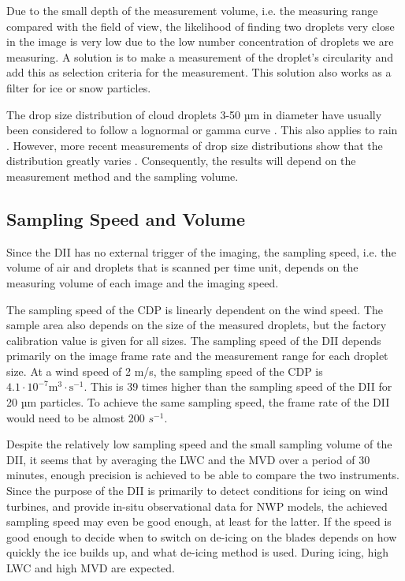 Due to the small depth of the measurement volume, i.e. the measuring range compared with the field of view, the likelihood of finding two droplets very close in the image is very low due to the low number concentration of droplets we are measuring. A solution is to make a measurement of the droplet’s circularity and add this as selection criteria for the measurement. This solution also works as a filter for ice or snow particles. 

The drop size distribution of cloud droplets 3-50 µm in diameter have usually been considered to follow a lognormal or gamma curve \cite{miles2000,lee2010,sein1998}. This also applies to rain \cite{ulb1983}. However, more recent measurements of drop size distributions show that the distribution greatly varies \cite{james2001,shaw2002,peters2005,cob2011}. Consequently, the results will depend on the measurement method and the sampling volume.

\subsection{Sampling Speed and Volume}

Since the DII has no external trigger of the imaging, the sampling speed, i.e. the volume of air and droplets that is scanned per time unit, depends on the measuring volume of each image and the imaging speed. 

The sampling speed of the CDP is linearly dependent on the wind speed. The sample area also depends on the size of the measured droplets, but the factory calibration value is given for all sizes. The sampling speed of the DII depends primarily on the image frame rate and the measurement range for each droplet size. At a wind speed of 2 m/s, the sampling speed of the CDP is $\mathrm{4.1 \cdot 10^{-7} m^{3} \cdot s^{-1}}$. This is 39 times higher than the sampling speed of the DII for 20 µm particles. To achieve the same sampling speed, the frame rate of the DII would need to be almost 200 $s^{-1}$. 

Despite the relatively low sampling speed and the small sampling volume of the DII, it seems that by averaging the LWC and the MVD over a period of 30 minutes, enough precision is achieved to be able to compare the two instruments. Since the purpose of the DII is primarily to detect conditions for icing on wind turbines, and provide in-situ observational data for NWP models, the achieved sampling speed may even be good enough, at least for the latter. If the speed is good enough to decide when to switch on de-icing on the blades depends on how quickly the ice builds up, and what de-icing method is used. During icing, high LWC and high MVD are expected.

